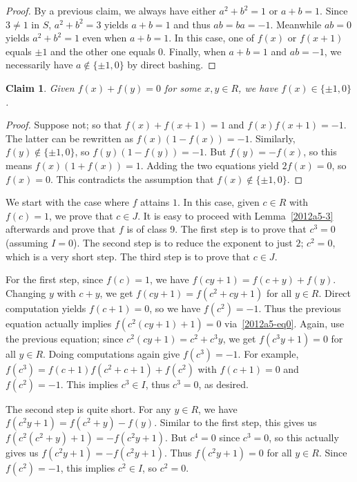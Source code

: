 \documentclass{article}
\newtheorem*{claim}{Claim}
\begin{document}
\begin{itemize}
\begin{proof}
    By a previous claim, we always have either $a^2 + b^2 = 1$ or $a + b = 1$.
    Since $3 \neq 1$ in $S$, $a^2 + b^2 = 3$ yields $a + b = 1$ and thus $ab = ba = -1$.
    Meanwhile $ab = 0$ yields $a^2 + b^2 = 1$ even when $a + b = 1$.
    In this case, one of $f(x)$ or $f(x + 1)$ equals $\pm 1$ and the other one equals $0$.
    Finally, when $a + b = 1$ and $ab = -1$, we necessarily have $a \notin \{\pm 1, 0\}$ by direct bashing.
    \end{proof}

    \begin{claim}
    Given $f(x) + f(y) = 0$ for some $x, y \in R$, we have $f(x) \in \{\pm 1, 0\}$.
    \end{claim}
    \begin{proof}
    Suppose not; so that $f(x) + f(x + 1) = 1$ and $f(x) f(x + 1) = -1$.
    The latter can be rewritten as $f(x) (1 - f(x)) = -1$.
    Similarly, $f(y) \notin \{\pm 1, 0\}$, so $f(y) (1 - f(y)) = -1$.
    But $f(y) = -f(x)$, so this means $f(x) (1 + f(x)) = 1$.
    Adding the two equations yield $2 f(x) = 0$, so $f(x) = 0$.
    This contradicts the assumption that $f(x) \notin \{\pm 1, 0\}$.
    \end{proof}

    \hrulefill

    We start with the case where $f$ attains $1$.
    In this case, given $c \in R$ with $f(c) = 1$, we prove that $c \in J$.
    It is easy to proceed with Lemma~\ref{2012a5-3} afterwards and prove that $f$ is of class 9.
    The first step is to prove that $c^3 = 0$ (assuming $I = 0$).
    The second step is to reduce the exponent to just $2$; $c^2 = 0$, which is a very short step.
    The third step is to prove that $c \in J$.

    For the first step, since $f(c) = 1$, we have $f(cy + 1) = f(c + y) + f(y)$.
    Changing $y$ with $c + y$, we get $f(cy + 1) = f(c^2 + cy + 1)$ for all $y \in R$.
    Direct computation yields $f(c + 1) = 0$, so we have $f(c^2) = -1$.
    Thus the previous equation actually implies $f(c^2 (cy + 1) + 1) = 0$ via~\eqref{2012a5-eq0}.
    Again, use the previous equation; since $c^2 (cy + 1) = c^2 + c^3 y$, we get $f(c^3 y + 1) = 0$ for all $y \in R$.
    Doing computations again give $f(c^3) = -1$.
    For example, $f(c^3) = f(c + 1) f(c^2 + c + 1) + f(c^2)$ with $f(c + 1) = 0$ and $f(c^2) = -1$.
    This implies $c^3 \in I$, thus $c^3 = 0$, as desired.

    The second step is quite short.
    For any $y \in R$, we have $f(c^2 y + 1) = f(c^2 + y) - f(y)$.
    Similar to the first step, this gives us $f(c^2 (c^2 + y) + 1) = -f(c^2 y + 1)$.
    But $c^4 = 0$ since $c^3 = 0$, so this actually gives us $f(c^2 y + 1) = -f(c^2 y + 1)$.
    Thus $f(c^2 y + 1) = 0$ for all $y \in R$.
    Since $f(c^2) = -1$, this implies $c^2 \in I$, so $c^2 = 0$.


\end{itemize}
\end{document}
